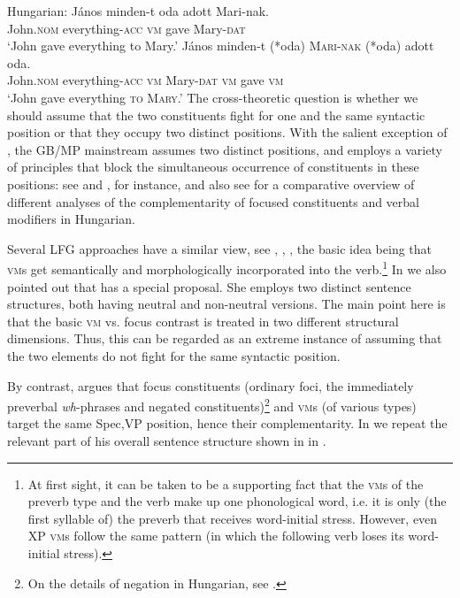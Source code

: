 \documentclass[output=paper,hidelinks]{langscibook}
\begin{document}
\ea%
\label{ex:FinnoUgric:6}Hungarian:
\ea\label{ex:FinnoUgric:6a}\gll
János minden-t oda adott Mari-nak.\\
John.\textsc{nom} everything-\textsc{acc} \textsc{vm} gave Mary-\textsc{dat}\\
\glt `John gave everything to Mary.'
\ex\label{ex:FinnoUgric:6b}\gll
János minden-t (*oda) \textsc{Mari-nak} (*oda) adott oda.\\
John.\textsc{nom} everything-\textsc{acc} \textsc{vm} Mary-\textsc{dat} \textsc{vm} gave \textsc{vm}\\
\glt`John gave everything \textsc{to} \textsc{Mary}.'
\z\z
The cross-theoretic question is whether we should assume that the two constituents fight for one and the same syntactic position or that they occupy two distinct positions. With the salient exception of \citet{Kiss1992,Kiss1994}, the GB/MP mainstream assumes two distinct positions, and employs a variety of principles that block the simultaneous occurrence of constituents in these positions: see \citet{Brody1990} and \citet{Kiss2004}, for instance, and also see \citet{Laczko2021} for a comparative overview of different analyses of the complementarity of focused constituents and verbal modifiers in Hungarian.

Several LFG approaches have a similar view, see \citet{Ackerman1987,Ackerman1990}, \citet{PayneChisarik2000}, \citet{Mycock2006,Mycock2010}, the basic idea being that \textsc{vm}s get semantically and morphologically incorporated into the verb.\footnote{At first sight, it can be taken to be a supporting fact that the \textsc{vm}s of the preverb type and the verb make up one phonological word, i.e. it is only (the first syllable of) the preverb that receives word-initial stress. However, even XP \textsc{vm}s follow the same pattern (in which the following verb loses its word-initial stress).} In  we also pointed out that \citet{Gazdik2012} has a special proposal. She employs two distinct sentence structures, both having neutral and non-neutral versions. The main point here is that the basic \textsc{vm} vs. focus contrast is treated in two different structural dimensions. Thus, this can be regarded as an extreme instance of assuming that the two elements do not fight for the same syntactic position.

By contrast, \citet{Laczko14} argues that focus constituents (ordinary foci, the immediately preverbal \textit{wh}{}-phrases and negated constituents)\footnote{On the details of negation in Hungarian, see .} and \textsc{vm}s (of various types) target the same Spec,VP position, hence their complementarity. In  we repeat the relevant part of his overall sentence structure shown in  in .
\end{document}
